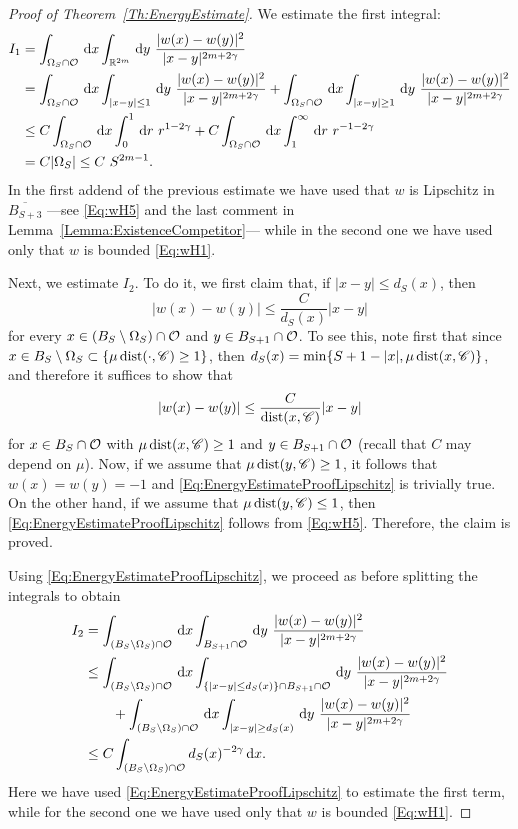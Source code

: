 \begin{proof}[Proof of Theorem~\ref{Th:EnergyEstimate}]
	We estimate the first integral:
	\begin{align*}
	I_1 &= \int_{\Omega_{S}\cap \ocal} \d x \int_{\R^{2m}} \d y \  \frac{|w(x)-w(y)|^2}{|x-y|^{2m+2\s}} \\
	&= \int_{\Omega_{S}\cap \ocal} \d x \int_{|x-y|\leq 1} \d y \ \frac{|w(x)-w(y)|^2}{|x-y|^{2m+2\s}} + \int_{\Omega_{S}\cap \ocal} \d x \int_{|x-y|\geq 1} \d y \ \frac{|w(x)-w(y)|^2}{|x-y|^{2m+2\s}} \\
	&\leq C \int_{\Omega_{S}\cap \ocal} \d x \int_0^1 \d r \ r^{1-2\s} + C \int_{\Omega_{S}\cap \ocal} \d x \int_1^\infty \d r \ r^{-1-2\s} \\
	&= C |\Omega_S| \leq C \ S^{2m-1}.
	\end{align*}
	In the first addend of the previous estimate we have used that $w$ is Lipschitz in $\overline{B_{S+3}}$ ---see \eqref{Eq:wH5} and the last comment in Lemma~\ref{Lemma:ExistenceCompetitor}--- while in the second one we have  used only that $w$ is bounded \eqref{Eq:wH1}. 
	
	Next, we estimate $I_2$. To do it, we first claim that, if $|x-y|\leq d_S(x)$, then
	\begin{equation}
		\label{Eq:EnergyEstimateProofLipschitz}
		|w(x)-w(y)| \leq \dfrac{C}{d_S(x)} |x-y|	
	\end{equation}
	for every $x\in (B_S\setminus \Omega_S)\cap \mathcal{O}$ and $y \in B_{S+1}\cap \mathcal{O}$. To see this, note first that since $x\in B_S\setminus \Omega_S \subset \{\mu \operatorname{dist} (\cdot, \mathscr{C}) \geq 1\}$, then $d_S(x)=\min \{S+1-|x| , \mu \operatorname{dist} (x, \mathscr{C})\}$, and therefore it suffices to show that
	$$
	|w(x)-w(y)| \leq \dfrac{C}{\operatorname{dist} (x, \mathscr{C})} |x-y|
	$$
	for $x\in B_S \cap \mathcal{O}$ with $\mu \operatorname{dist} (x, \mathscr{C}) \geq 1$ and $y \in B_{S+1}\cap \mathcal{O}$ (recall that $C$ may depend on $\mu$). Now, if we assume that $\mu \operatorname{dist} (y, \mathscr{C}) \geq 1$, it follows that $w(x)=w(y)=-1$ and \eqref{Eq:EnergyEstimateProofLipschitz} is trivially true. On the other hand, if we assume that $\mu \operatorname{dist} (y, \mathscr{C}) \leq 1$, then \eqref{Eq:EnergyEstimateProofLipschitz} follows from \eqref{Eq:wH5}. Therefore, the claim is proved.
	
	Using \eqref{Eq:EnergyEstimateProofLipschitz}, we proceed as before splitting the integrals to obtain
	\begin{align*}
	I_2 &= \int_{(B_S\setminus \Omega_S)\cap \mathcal{O}} \,\mathrm{d} x \int_{B_{S+1}\cap \mathcal{O}} \,\mathrm{d} y \  \frac{|w(x)-w(y)|^2}{|x-y|^{2m+2\gamma}}   \\
	&\leq \int_{(B_S\setminus \Omega_S)\cap \mathcal{O}} \,\mathrm{d} x \int_{ \{|x-y|\leq d_S(x)\} \cap B_{S+1}\cap \mathcal{O}} \,\mathrm{d} y \  \frac{|w(x)-w(y)|^2}{|x-y|^{2m+2\gamma}} \\
	& \quad \quad + \int_{(B_S\setminus \Omega_S)\cap \mathcal{O}} \,\mathrm{d} x \int_{|x-y|\geq d_S(x)} \,\mathrm{d} y \ \frac{|w(x)-w(y)|^2}{|x-y|^{2m+2\gamma}} \\
	&\leq C \int_{(B_S\setminus \Omega_S)\cap \mathcal{O}} d_S(x)^{-2\gamma} \,\mathrm{d} x .
	\end{align*}
	Here we have used \eqref{Eq:EnergyEstimateProofLipschitz} to estimate the first term, while for the second one we have used only that $w$ is bounded \eqref{Eq:wH1}. 
	

\end{proof}
